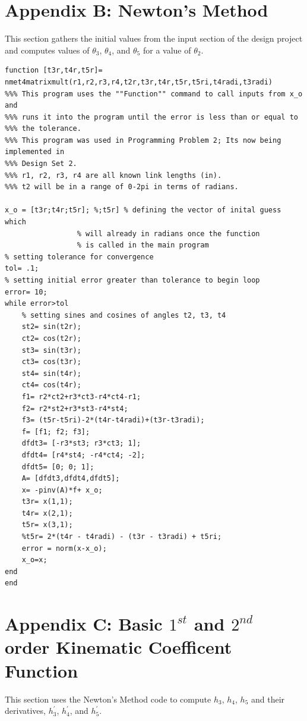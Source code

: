 \documentclass[12pt]{article}
\begin{document}
\section*{Appendix B: Newton's Method}
\begin{doublespace}
This section gathers the initial values from the input section of the design project and computes values of $\theta_{3}$, $\theta_{4}$, and $\theta_{5}$ for a value of $\theta_{2}$.
\end{doublespace}

\begingroup
\fontsize{8pt}{10pt}\selectfont
\begin{verbatim}
function [t3r,t4r,t5r]= nmet4matrixmult(r1,r2,r3,r4,t2r,t3r,t4r,t5r,t5ri,t4radi,t3radi)
%%% This program uses the ""Function"" command to call inputs from x_o and 
%%% runs it into the program until the error is less than or equal to 
%%% the tolerance.
%%% This program was used in Programming Problem 2; Its now being implemented in
%%% Design Set 2. 
%%% r1, r2, r3, r4 are all known link lengths (in). 
%%% t2 will be in a range of 0-2pi in terms of radians.

x_o = [t3r;t4r;t5r]; %;t5r] % defining the vector of inital guess which 
                 % will already in radians once the function 
                 % is called in the main program
% setting tolerance for convergence
tol= .1;
% setting initial error greater than tolerance to begin loop
error= 10;
while error>tol
    % setting sines and cosines of angles t2, t3, t4
    st2= sin(t2r);
    ct2= cos(t2r);
    st3= sin(t3r);
    ct3= cos(t3r);
    st4= sin(t4r);
    ct4= cos(t4r);
    f1= r2*ct2+r3*ct3-r4*ct4-r1;   
    f2= r2*st2+r3*st3-r4*st4;
    f3= (t5r-t5ri)-2*(t4r-t4radi)+(t3r-t3radi);
    f= [f1; f2; f3];
    dfdt3= [-r3*st3; r3*ct3; 1];  
    dfdt4= [r4*st4; -r4*ct4; -2]; 
    dfdt5= [0; 0; 1];
    A= [dfdt3,dfdt4,dfdt5];
    x= -pinv(A)*f+ x_o;
    t3r= x(1,1);
    t4r= x(2,1);
    t5r= x(3,1);
    %t5r= 2*(t4r - t4radi) - (t3r - t3radi) + t5ri;
    error = norm(x-x_o);
    x_o=x;
end
end
\end{verbatim}
\endgroup

\newpage

\section*{Appendix C: Basic $1^{st}$ and $2^{nd}$ order Kinematic Coefficent Function}
\begin{doublespace}
This section uses the Newton's Method code to compute $h_{3}$, $h_{4}$, $h_{5}$ and their derivatives, $h^{\prime}_{3}$, $h^{\prime}_{4}$, and $h^{\prime}_{5}$.
\end{doublespace}
\end{document}
